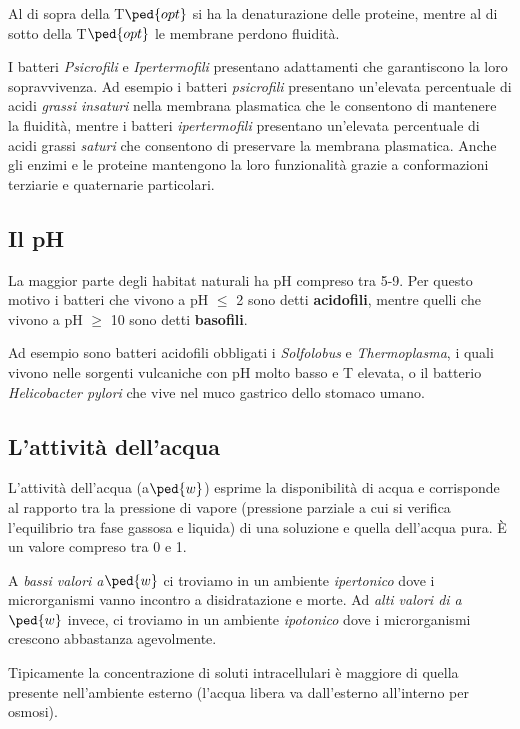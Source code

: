 \documentclass[11pt]{book}
\begin{document}
Al di sopra della T$\ped{opt}$ si ha la denaturazione delle proteine, mentre al di sotto della T$\ped{opt}$ le membrane perdono fluidità.

\vspace{1em}
I batteri \emph{Psicrofili} e \emph{Ipertermofili} presentano adattamenti che garantiscono la loro sopravvivenza.
Ad esempio i batteri \emph{psicrofili} presentano un’elevata percentuale di acidi \emph{grassi insaturi} nella membrana plasmatica che le consentono di mantenere la fluidità, mentre i batteri \emph{ipertermofili} presentano un’elevata percentuale di acidi grassi \emph{saturi} che consentono di preservare la membrana plasmatica. Anche gli enzimi e le proteine mantengono la loro funzionalità grazie a conformazioni terziarie e quaternarie particolari.

\subsection{Il pH}
La maggior parte degli habitat naturali ha pH compreso tra 5-9. Per questo motivo i batteri che vivono a pH $\le$ 2 sono detti \textbf{acidofili}, mentre quelli che vivono a pH $\ge$ 10 sono detti \textbf{basofili}.

Ad esempio sono batteri acidofili obbligati i \emph{Solfolobus} e \emph{Thermoplasma}, i quali vivono nelle sorgenti vulcaniche con pH molto basso e T elevata, o il batterio \emph{Helicobacter pylori} che vive nel muco gastrico dello stomaco umano.

\subsection{L'attività dell’acqua}
L’attività dell’acqua (a$\ped{w}$) esprime la disponibilità di acqua e corrisponde al rapporto tra la pressione di vapore (pressione parziale a cui si verifica l’equilibrio tra fase gassosa e liquida) di una soluzione e quella dell’acqua pura. \`E un valore compreso tra 0 e 1.

A \emph{bassi valori a$\ped{w}$} ci troviamo in un ambiente \emph{ipertonico} dove i microrganismi vanno incontro a disidratazione e morte. 
Ad \emph{alti valori di a$\ped{w}$} invece, ci troviamo in un ambiente \emph{ipotonico} dove i microrganismi crescono abbastanza agevolmente.

Tipicamente la concentrazione di soluti intracellulari è maggiore di quella presente nell’ambiente esterno (l’acqua libera va dall’esterno all’interno per osmosi). 
\end{document}
